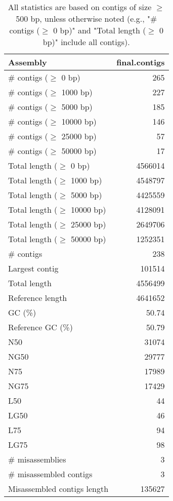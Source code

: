 \documentclass[12pt,a4paper]{article}
\begin{document}
\begin{table}[ht]
\begin{center}
\caption{All statistics are based on contigs of size $\geq$ 500 bp, unless otherwise noted (e.g., "\# contigs ($\geq$ 0 bp)" and "Total length ($\geq$ 0 bp)" include all contigs).}
\begin{tabular}{|l*{1}{|r}|}
\hline
Assembly & final.contigs \\ \hline
\# contigs ($\geq$ 0 bp) & 265 \\ \hline
\# contigs ($\geq$ 1000 bp) & 227 \\ \hline
\# contigs ($\geq$ 5000 bp) & 185 \\ \hline
\# contigs ($\geq$ 10000 bp) & 146 \\ \hline
\# contigs ($\geq$ 25000 bp) & 57 \\ \hline
\# contigs ($\geq$ 50000 bp) & 17 \\ \hline
Total length ($\geq$ 0 bp) & 4566014 \\ \hline
Total length ($\geq$ 1000 bp) & 4548797 \\ \hline
Total length ($\geq$ 5000 bp) & 4425559 \\ \hline
Total length ($\geq$ 10000 bp) & 4128091 \\ \hline
Total length ($\geq$ 25000 bp) & 2649706 \\ \hline
Total length ($\geq$ 50000 bp) & 1252351 \\ \hline
\# contigs & 238 \\ \hline
Largest contig & 101514 \\ \hline
Total length & 4556499 \\ \hline
Reference length & 4641652 \\ \hline
GC (\%) & 50.74 \\ \hline
Reference GC (\%) & 50.79 \\ \hline
N50 & 31074 \\ \hline
NG50 & 29777 \\ \hline
N75 & 17989 \\ \hline
NG75 & 17429 \\ \hline
L50 & 44 \\ \hline
LG50 & 46 \\ \hline
L75 & 94 \\ \hline
LG75 & 98 \\ \hline
\# misassemblies & 3 \\ \hline
\# misassembled contigs & 3 \\ \hline
Misassembled contigs length & 135627 \\ \hline

\end{tabular}
\end{center}
\end{table}
\end{document}
